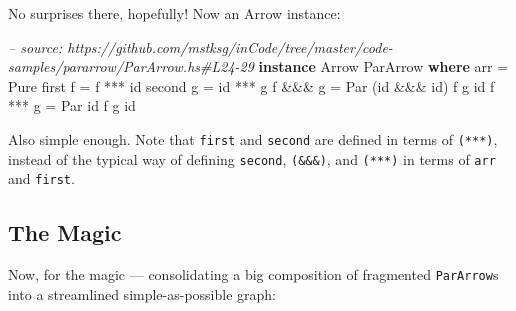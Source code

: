 \documentclass[]{article}
\newenvironment{Shaded}{}{}
\newcommand{\KeywordTok}[1]{\textcolor[rgb]{0.00,0.44,0.13}{\textbf{{#1}}}}
\newcommand{\DataTypeTok}[1]{\textcolor[rgb]{0.56,0.13,0.00}{{#1}}}
\newcommand{\CommentTok}[1]{\textcolor[rgb]{0.38,0.63,0.69}{\textit{{#1}}}}
\newcommand{\FunctionTok}[1]{\textcolor[rgb]{0.02,0.16,0.49}{{#1}}}
\newcommand{\NormalTok}[1]{{#1}}
\begin{document}
No surprises there, hopefully! Now an Arrow instance:

\begin{Shaded}
\begin{Highlighting}[]
\CommentTok{-- source: https://github.com/mstksg/inCode/tree/master/code-samples/pararrow/ParArrow.hs#L24-29}
\KeywordTok{instance} \DataTypeTok{Arrow} \DataTypeTok{ParArrow} \KeywordTok{where}
    \NormalTok{arr      }\FunctionTok{=} \DataTypeTok{Pure}
    \NormalTok{first f  }\FunctionTok{=} \NormalTok{f  }\FunctionTok{***} \NormalTok{id}
    \NormalTok{second g }\FunctionTok{=} \NormalTok{id }\FunctionTok{***} \NormalTok{g}
    \NormalTok{f }\FunctionTok{&&&} \NormalTok{g  }\FunctionTok{=} \DataTypeTok{Par} \NormalTok{(id }\FunctionTok{&&&} \NormalTok{id) f g id}
    \NormalTok{f }\FunctionTok{***} \NormalTok{g  }\FunctionTok{=} \DataTypeTok{Par} \NormalTok{id          f g id}
\end{Highlighting}
\end{Shaded}

Also simple enough. Note that \texttt{first} and \texttt{second} are
defined in terms of \texttt{(***)}, instead of the typical way of
defining \texttt{second}, \texttt{(\&\&\&)}, and \texttt{(***)} in terms
of \texttt{arr} and \texttt{first}.

\subsection{The Magic}\label{the-magic}

Now, for the magic --- consolidating a big composition of fragmented
\texttt{ParArrow}s into a streamlined simple-as-possible graph:
\end{document}
